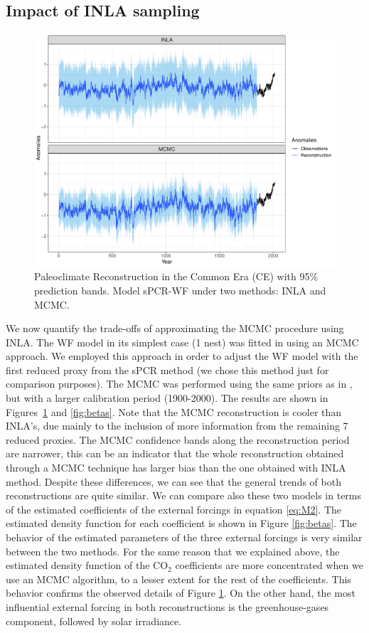 \documentclass[12pt]{amsart}
\theoremstyle{plain}
\theoremstyle{definition}
\theoremstyle{remark}
\begin{document}
\subsection{Impact of INLA sampling}

\begin{figure}
  \centering
  \includegraphics[scale=0.35]{RecCE_MCMC}
  \caption{Paleoclimate Reconstruction in the Common Era (CE) with 95\%
    prediction bands. Model sPCR-WF under two methods: INLA and MCMC.}
  \label{fig:paleoCE4}
\end{figure}

We now quantify the trade-offs of approximating the MCMC procedure using INLA. The WF model in its simplest case (1 nest) was fitted in \cite{Barboza2014}
using an MCMC approach. We employed this approach in order to adjust the
WF model with the first reduced proxy from the sPCR method (we chose this method
just for comparison purposes). The MCMC was performed using the
same priors as in \cite{Barboza2014}, but with a larger calibration period
(1900-2000). The results are shown in Figures~\ref{fig:paleoCE4} and
\ref{fig:betas}. Note that the MCMC reconstruction is cooler than INLA's, due
mainly to the inclusion of more information from the remaining 7 reduced
proxies. The MCMC confidence bands along the reconstruction period are narrower,
this can be an indicator that the whole reconstruction obtained through a MCMC technique has larger
bias than the one obtained with INLA method. Despite these differences, we can
see that the general trends of both reconstructions are quite similar. We can
compare also these two models in terms of the estimated coefficients of the
external forcings in equation \eqref{eq:M2}. The estimated density function
for each coefficient is shown in Figure \ref{fig:betas}. The behavior of the
estimated parameters of the three external forcings is very similar between the
two methods. For the same reason that we explained above, the estimated density
function of the CO$_2$ coefficients are more
concentrated when we use an MCMC algorithm, to a lesser extent for the rest of the
coefficients. This behavior confirms the observed details of Figure
\ref{fig:paleoCE4}. On the other hand, the most influential external forcing in
both reconstructions is the greenhouse-gases component, followed by solar irradiance.
\end{document}
